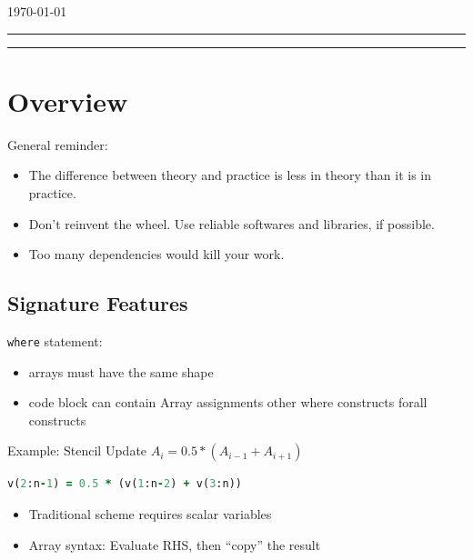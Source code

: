 \documentclass[11pt]{book} %
\begin{document}
\begin{titlepage}
	{\large\textsc{\today}} %
	
	\vspace{0.1\textheight} %
	
	
	\rule{\textwidth}{0.4pt} %
	
	\vspace{2pt}\vspace{-\baselineskip} %
	
	\rule{\textwidth}{1pt} %
	
\end{titlepage}


\newpage
\tableofcontents
\newpage

\chapter{Overview}

General reminder:
\begin{itemize}
\item The difference between theory and practice is less in theory than it is in practice.
\item Don't reinvent the wheel. Use reliable softwares and libraries, if possible.
\item Too many dependencies would kill your work.
\end{itemize}

\section{Signature Features}

\verb|where| statement:
\begin{itemize}
\item arrays must have the same shape
\item code block can contain
\subitem Array assignments
\subitem other where constructs
\subitem forall constructs
\end{itemize}

Example: Stencil Update $A_{i}=0.5*(A_{i-1}+A_{i+1})$
\begin{lstlisting}[language=Fortran, caption=Stencil update 1D]
v(2:n-1) = 0.5 * (v(1:n-2) + v(3:n))
\end{lstlisting}
\begin{itemize}
\item Traditional scheme requires scalar variables
\item Array syntax: Evaluate RHS, then “copy” the result
\end{itemize}
\end{document}
